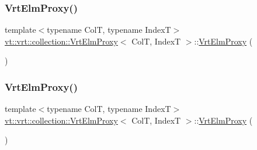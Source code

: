 \mbox{\label{structvt_1_1vrt_1_1collection_1_1_vrt_elm_proxy_ac0ac82f67b1a4d2e3cbd52ebdf32cc7a}} 
\subsubsection{\texorpdfstring{Vrt\+Elm\+Proxy()}{VrtElmProxy()}\hspace{0.1cm}{\footnotesize\ttfamily [4/5]}}
{\footnotesize\ttfamily template$<$typename ColT, typename IndexT$>$ \\
\hyperlink{structvt_1_1vrt_1_1collection_1_1_vrt_elm_proxy}{vt\+::vrt\+::collection\+::\+Vrt\+Elm\+Proxy}$<$ ColT, IndexT $>$\+::\hyperlink{structvt_1_1vrt_1_1collection_1_1_vrt_elm_proxy}{Vrt\+Elm\+Proxy} (\begin{DoxyParamCaption}\item[{\hyperlink{structvt_1_1vrt_1_1collection_1_1_vrt_elm_proxy}{Vrt\+Elm\+Proxy}$<$ ColT, IndexT $>$ const \&}]{ }\end{DoxyParamCaption})\hspace{0.3cm}{\ttfamily [default]}}

\mbox{\label{structvt_1_1vrt_1_1collection_1_1_vrt_elm_proxy_a451958f72d1dc1a5633ada75558cc5f5}} 
\subsubsection{\texorpdfstring{Vrt\+Elm\+Proxy()}{VrtElmProxy()}\hspace{0.1cm}{\footnotesize\ttfamily [5/5]}}
{\footnotesize\ttfamily template$<$typename ColT, typename IndexT$>$ \\
\hyperlink{structvt_1_1vrt_1_1collection_1_1_vrt_elm_proxy}{vt\+::vrt\+::collection\+::\+Vrt\+Elm\+Proxy}$<$ ColT, IndexT $>$\+::\hyperlink{structvt_1_1vrt_1_1collection_1_1_vrt_elm_proxy}{Vrt\+Elm\+Proxy} (\begin{DoxyParamCaption}\item[{\hyperlink{structvt_1_1vrt_1_1collection_1_1_vrt_elm_proxy}{Vrt\+Elm\+Proxy}$<$ ColT, IndexT $>$ \&\&}]{ }\end{DoxyParamCaption})\hspace{0.3cm}{\ttfamily [default]}}



